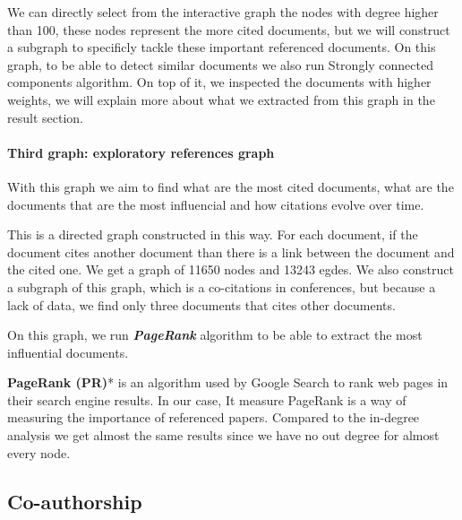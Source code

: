 \documentclass[article,twocolumn]{IEEEtran}
\begin{document}
    \begin{figure}
        \begin{center}\end{center}
        \caption{}
        \label{}
    \end{figure}
    
    We can directly select from the interactive graph the nodes with degree
higher than 100, these nodes represent the more cited documents, but we
will construct a subgraph to specificly tackle these important
referenced documents. On this graph, to be able to detect similar
documents we also run Strongly connected components algorithm. On top of
it, we inspected the documents with higher weights, we will explain more
about what we extracted from this graph in the result section.

    \hypertarget{third-graph-exploratory-references-graph}{%
\paragraph{Third graph: exploratory references
graph}\label{third-graph-exploratory-references-graph}}

With this graph we aim to find what are the most cited documents, what
are the documents that are the most influencial and how citations evolve
over time.

This is a directed graph constructed in this way. For each document, if
the document cites another document than there is a link between the
document and the cited one. We get a graph of 11650 nodes and 13243
egdes. We also construct a subgraph of this graph, which is a
co-citations in conferences, but because a lack of data, we find only
three documents that cites other documents.

On this graph, we run \textbf{\emph{PageRank}} algorithm to be able to
extract the most influential documents.

\textbf{PageRank (PR)}* is an algorithm used by Google Search to rank
web pages in their search engine results. In our case, It measure
PageRank is a way of measuring the importance of referenced papers.
Compared to the in-degree analysis we get almost the same results since
we have no out degree for almost every node.



    \hypertarget{co-authorship}{%
\subsection{Co-authorship}\label{co-authorship}}
\end{document}
